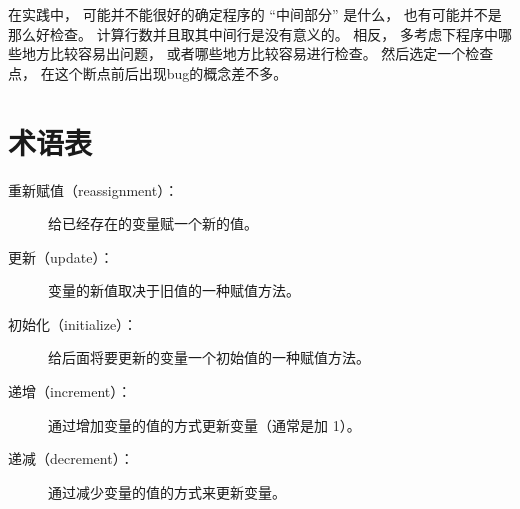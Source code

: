 在实践中， 可能并不能很好的确定程序的 ``中间部分'' 是什么， 也有可能并不是那么好检查。
计算行数并且取其中间行是没有意义的。 相反， 多考虑下程序中哪些地方比较容易出问题， 或者哪些地方比较容易进行检查。 然后选定一个检查点， 在这个断点前后出现bug的概念差不多。

\section{术语表}

\begin{description}


\item[重新赋值（reassignment）：] 给已经存在的变量赋一个新的值。


\item[更新（update）：] 变量的新值取决于旧值的一种赋值方法。


\item[初始化（initialize）：] 给后面将要更新的变量一个初始值的一种赋值方法。


\item[递增（increment）：] 通过增加变量的值的方式更新变量（通常是加 1）。


\item[递减（decrement）：] 通过减少变量的值的方式来更新变量。


\end{description}
